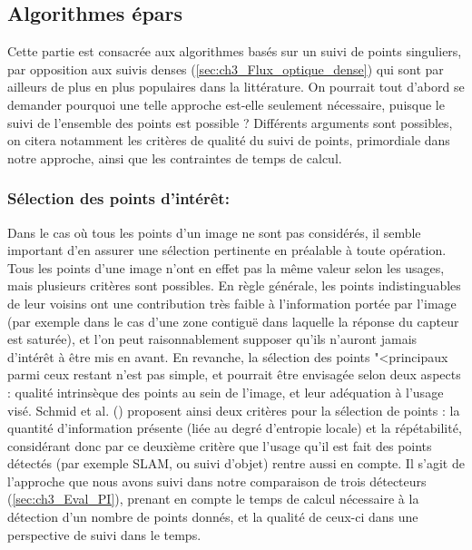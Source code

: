 \subsection{Algorithmes \og épars\fg{}} \label{sec:ch3_Vision_epars}
Cette partie est consacrée aux algorithmes basés sur un suivi de points singuliers, par opposition aux suivis denses (\ref{sec:ch3_Flux_optique_dense}) qui sont par ailleurs de plus en plus populaires dans la littérature. On pourrait tout d'abord se demander pourquoi une telle approche est-elle seulement nécessaire, puisque le suivi de l'ensemble des points est possible ? Différents arguments sont possibles, on citera notamment les critères de qualité du suivi de points, primordiale dans notre approche, ainsi que les contraintes de temps de calcul. 

\subsubsection{Sélection des points d'intérêt:} \label{sec:ch3_Détection_points_intérêt}
Dans le cas où tous les points d'un image ne sont pas considérés, il semble important d'en assurer une sélection pertinente en préalable à toute opération. Tous les points d'une image n'ont en effet pas la même valeur selon les usages, mais plusieurs critères sont possibles. En règle générale, les points indistinguables de leur voisins ont une contribution très faible à l'information portée par l'image (par exemple dans le cas d'une zone contiguë dans laquelle la réponse du capteur est saturée), et l'on peut raisonnablement supposer qu'ils n'auront jamais d'intérêt à être mis en avant. En revanche, la sélection des points "<principaux\fg{} parmi ceux restant n'est pas simple, et pourrait être envisagée selon deux aspects : qualité intrinsèque des points au sein de l'image, et leur adéquation à l'usage visé. Schmid et al. (\cite{Schmid2000}) proposent ainsi deux critères pour la sélection de points : la quantité d'information présente (liée au degré d'entropie locale) et la répétabilité, considérant donc par ce deuxième critère que l'usage qu'il est fait des points détectés (par exemple SLAM, ou suivi d'objet) rentre aussi en compte. Il s'agit de l'approche que nous avons suivi dans notre comparaison de trois détecteurs (\ref{sec:ch3_Eval_PI}), prenant en compte le temps de calcul nécessaire à la détection d'un nombre de points donnés, et la qualité de ceux-ci dans une perspective de suivi dans le temps.\\

